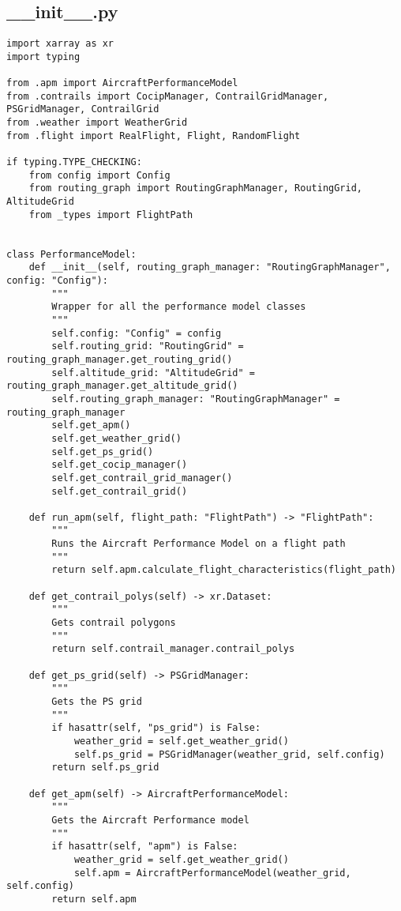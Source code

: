 \subsection{__init__.py}
\begin{verbatim}
import xarray as xr
import typing

from .apm import AircraftPerformanceModel
from .contrails import CocipManager, ContrailGridManager, PSGridManager, ContrailGrid
from .weather import WeatherGrid
from .flight import RealFlight, Flight, RandomFlight

if typing.TYPE_CHECKING:
    from config import Config
    from routing_graph import RoutingGraphManager, RoutingGrid, AltitudeGrid
    from _types import FlightPath


class PerformanceModel:
    def __init__(self, routing_graph_manager: "RoutingGraphManager", config: "Config"):
        """
        Wrapper for all the performance model classes
        """
        self.config: "Config" = config
        self.routing_grid: "RoutingGrid" = routing_graph_manager.get_routing_grid()
        self.altitude_grid: "AltitudeGrid" = routing_graph_manager.get_altitude_grid()
        self.routing_graph_manager: "RoutingGraphManager" = routing_graph_manager
        self.get_apm()
        self.get_weather_grid()
        self.get_ps_grid()
        self.get_cocip_manager()
        self.get_contrail_grid_manager()
        self.get_contrail_grid()

    def run_apm(self, flight_path: "FlightPath") -> "FlightPath":
        """
        Runs the Aircraft Performance Model on a flight path
        """
        return self.apm.calculate_flight_characteristics(flight_path)

    def get_contrail_polys(self) -> xr.Dataset:
        """
        Gets contrail polygons
        """
        return self.contrail_manager.contrail_polys

    def get_ps_grid(self) -> PSGridManager:
        """
        Gets the PS grid
        """
        if hasattr(self, "ps_grid") is False:
            weather_grid = self.get_weather_grid()
            self.ps_grid = PSGridManager(weather_grid, self.config)
        return self.ps_grid

    def get_apm(self) -> AircraftPerformanceModel:
        """
        Gets the Aircraft Performance model
        """
        if hasattr(self, "apm") is False:
            weather_grid = self.get_weather_grid()
            self.apm = AircraftPerformanceModel(weather_grid, self.config)
        return self.apm


\end{verbatim}
